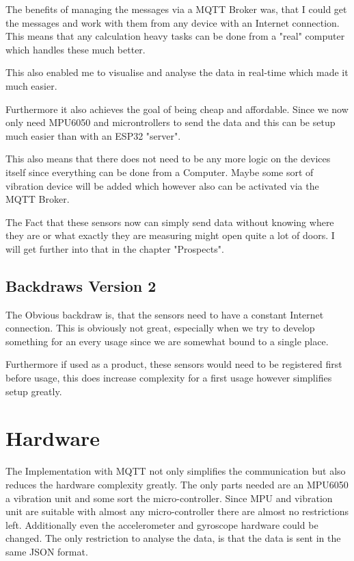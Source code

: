 The benefits of managing the messages via a MQTT Broker was, that I could get the messages and work with them from any device with an Internet connection. This means that any calculation heavy tasks can be done from a "real" computer which handles these much better. 

This also enabled me to visualise and analyse the data in real-time which made it much easier. 

Furthermore it also achieves the goal of being cheap and affordable. Since we now only need MPU6050 and microntrollers to send the data and this can be setup much easier than with an ESP32 "server".

This also means that there does not need to be any more logic on the devices itself since everything can be done from a Computer. Maybe some sort of vibration device will be added which however also can be activated via the MQTT Broker. 

The Fact that these sensors now can simply send data without knowing where they are or what exactly they are measuring might open quite a lot of doors. I will get further into that in the chapter "Prospects".

\subsection{Backdraws Version 2}

The Obvious backdraw is, that the sensors need to have a constant Internet connection. This is obviously not great, especially when we try to develop something for an every usage since we are somewhat bound to a single place. 

Furthermore if used as a product, these sensors would need to be registered first before usage, this does increase complexity for a first usage however simplifies setup greatly.







\section{Hardware}

The Implementation with MQTT not only simplifies the communication but also reduces the hardware complexity greatly. The only parts needed are an MPU6050 a vibration unit and some sort the micro-controller. Since MPU and vibration unit are suitable with almost any micro-controller there are almost no restrictions left. Additionally even the accelerometer and gyroscope hardware could be changed. The only restriction to analyse the data, is that the data is sent in the same JSON format. 


